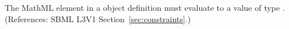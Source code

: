 The MathML  element in a \Constraint object definition must
evaluate to a value of type .  (References: SBML L3V1
Section~\ref{sec:constraints}.)
